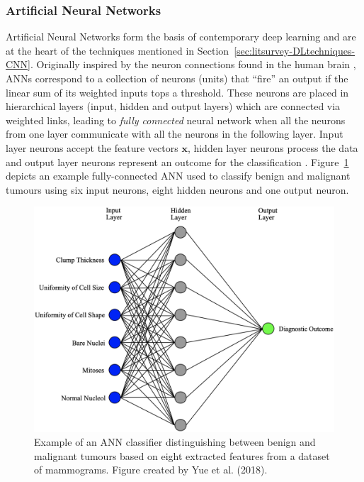 \subsubsection{Artificial Neural Networks}

Artificial Neural Networks form the basis of contemporary deep learning and are at the heart of the techniques mentioned in Section~\ref{sec:litsurvey-DLtechniques-CNN}. Originally inspired by the neuron connections found in the human brain \cite{mcculloch1943logical}, ANNs correspond to a collection of neurons (units) that ``fire'' an output if the linear sum of its weighted inputs tops a threshold. These neurons are placed in hierarchical layers (input, hidden and output layers) which are connected via weighted links, leading to \textit{fully connected} neural network when all the neurons from one layer communicate with all the neurons in the following layer. Input layer neurons accept the feature vectors $\textbf{x}$, hidden layer neurons process the data and output layer neurons represent an outcome for the classification \cite{russell2002artificial}. Figure~\ref{fig:litsurvey-ann-example} depicts an example fully-connected ANN used to classify benign and malignant tumours using six input neurons, eight hidden neurons and one output neuron.

\begin{figure}[ht]
\centerline{\includegraphics[width=\textwidth]{Dissertation/figures/litsurvey/ann.png}}
\caption{\label{fig:litsurvey-ann-example}Example of an ANN classifier distinguishing between benign and malignant tumours based on eight extracted features from a dataset of mammograms. Figure created by Yue et al. (2018).}
\end{figure}


